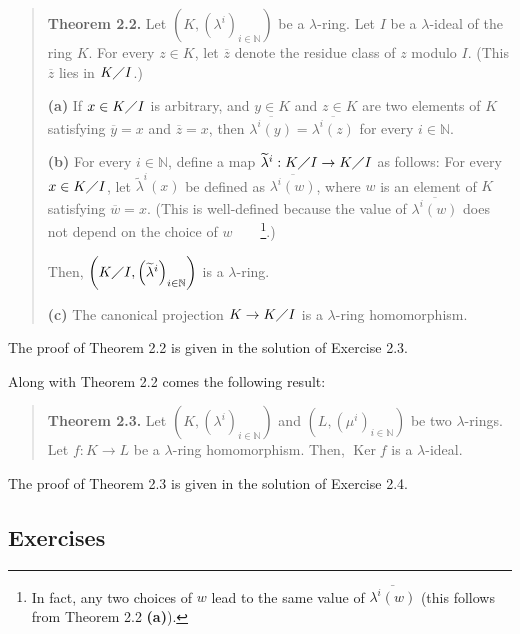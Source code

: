 \documentclass[numbers=enddot,12pt,final,onecolumn,notitlepage]{scrartcl}%
\begin{document}
\begin{quote}
\textbf{Theorem 2.2.} Let $\left(  K,\left(  \lambda^{i}\right)
_{i\in\mathbb{N}}\right)  $ be a $\lambda$-ring. Let $I$ be a $\lambda$-ideal
of the ring $K$. For every $z\in K$, let $\overline{z}$ denote the residue
class of $z$ modulo $I$. (This $\overline{z}$ lies in $K\diagup I$.)

\textbf{(a)} If $x\in K\diagup I$ is arbitrary, and $y\in K$ and $z\in K$ are
two elements of $K$ satisfying $\overline{y}=x$ and $\overline{z}=x$, then
$\overline{\lambda^{i}\left(  y\right)  }=\overline{\lambda^{i}\left(
z\right)  }$ for every $i\in\mathbb{N}$.

\textbf{(b)} For every $i\in\mathbb{N}$, define a map $\widetilde{\lambda}%
^{i}:K\diagup I\rightarrow K\diagup I$ as follows: For every $x\in K\diagup
I$, let $\widetilde{\lambda}^{i}\left(  x\right)  $ be defined as
$\overline{\lambda^{i}\left(  w\right)  }$, where $w$ is an element of $K$
satisfying $\overline{w}=x$. (This is well-defined because the value of
$\overline{\lambda^{i}\left(  w\right)  }$ does not depend on the choice of
$w$\ \ \ \ \footnote{In fact, any two choices of $w$ lead to the same value of
$\overline{\lambda^{i}\left(  w\right)  }$ (this follows from Theorem 2.2
\textbf{(a)}).}.)

Then, $\left(  K\diagup I,\left(  \widetilde{\lambda}^{i}\right)
_{i\in\mathbb{N}}\right)  $ is a $\lambda$-ring.

\textbf{(c)} The canonical projection $K\rightarrow K\diagup I$ is a $\lambda
$-ring homomorphism.
\end{quote}

The proof of Theorem 2.2 is given in the solution of Exercise 2.3.

Along with Theorem 2.2 comes the following result:

\begin{quote}
\textbf{Theorem 2.3.} Let $\left(  K,\left(  \lambda^{i}\right)
_{i\in\mathbb{N}}\right)  $ and $\left(  L,\left(  \mu^{i}\right)
_{i\in\mathbb{N}}\right)  $ be two $\lambda$-rings. Let $f:K\rightarrow L$ be
a $\lambda$-ring homomorphism. Then, $\operatorname*{Ker}f$ is a $\lambda$-ideal.
\end{quote}

The proof of Theorem 2.3 is given in the solution of Exercise 2.4.

\subsection{Exercises}
\end{document}
